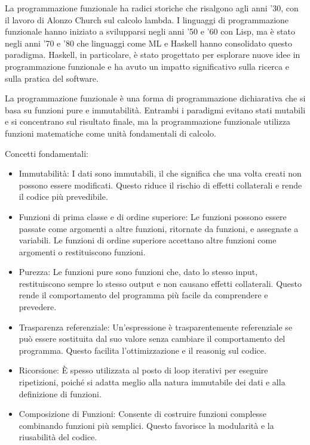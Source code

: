 \documentclass[
  letterpaper,
  DIV=11,
  numbers=noendperiod]{scrreprt}
\providecommand{\tightlist}{%
  \setlength{\itemsep}{0pt}\setlength{\parskip}{0pt}}\usepackage{longtable,booktabs,array}
\begin{document}
La programmazione funzionale ha radici storiche che risalgono agli anni
'30, con il lavoro di Alonzo Church sul calcolo lambda. I linguaggi di
programmazione funzionale hanno iniziato a svilupparsi negli anni '50 e
'60 con Lisp, ma è stato negli anni '70 e '80 che linguaggi come ML e
Haskell hanno consolidato questo paradigma. Haskell, in particolare, è
stato progettato per esplorare nuove idee in programmazione funzionale e
ha avuto un impatto significativo sulla ricerca e sulla pratica del
software.

La programmazione funzionale è una forma di programmazione dichiarativa
che si basa su funzioni pure e immutabilità. Entrambi i paradigmi
evitano stati mutabili e si concentrano sul risultato finale, ma la
programmazione funzionale utilizza funzioni matematiche come unità
fondamentali di calcolo.

Concetti fondamentali:

\begin{itemize}
\tightlist
\item
  Immutabilità: I dati sono immutabili, il che significa che una volta
  creati non possono essere modificati. Questo riduce il rischio di
  effetti collaterali e rende il codice più prevedibile.
\item
  Funzioni di prima classe e di ordine superiore: Le funzioni possono
  essere passate come argomenti a altre funzioni, ritornate da funzioni,
  e assegnate a variabili. Le funzioni di ordine superiore accettano
  altre funzioni come argomenti o restituiscono funzioni.
\item
  Purezza: Le funzioni pure sono funzioni che, dato lo stesso input,
  restituiscono sempre lo stesso output e non causano effetti
  collaterali. Questo rende il comportamento del programma più facile da
  comprendere e prevedere.
\item
  Trasparenza referenziale: Un'espressione è trasparentemente
  referenziale se può essere sostituita dal suo valore senza cambiare il
  comportamento del programma. Questo facilita l'ottimizzazione e il
  reasonig sul codice.
\item
  Ricorsione: È spesso utilizzata al posto di loop iterativi per
  eseguire ripetizioni, poiché si adatta meglio alla natura immutabile
  dei dati e alla definizione di funzioni.
\item
  Composizione di Funzioni: Consente di costruire funzioni complesse
  combinando funzioni più semplici. Questo favorisce la modularità e la
  riusabilità del codice.
\end{itemize}
\end{document}
